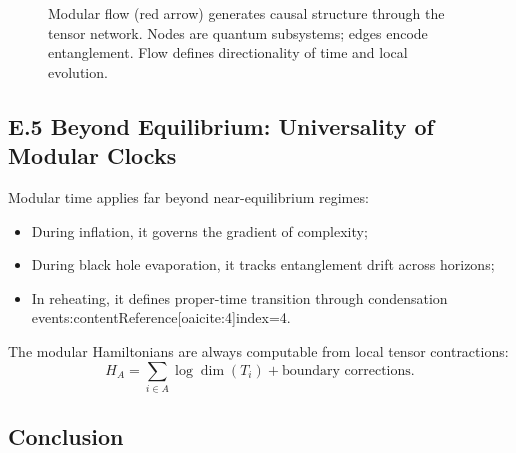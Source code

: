 \documentclass[11pt]{article}
\begin{document}
\begin{figure}[H]
\centering
{}
\caption{Modular flow (red arrow) generates causal structure through the tensor network. Nodes are quantum subsystems; edges encode entanglement. Flow defines directionality of time and local evolution.}
\label{fig:modular-flow-alt}
\end{figure}

\subsection*{E.5 Beyond Equilibrium: Universality of Modular Clocks}

Modular time applies far beyond near-equilibrium regimes:
\begin{itemize}
  \item During inflation, it governs the gradient of complexity;
  \item During black hole evaporation, it tracks entanglement drift across horizons;
  \item In reheating, it defines proper-time transition through condensation events:contentReference[oaicite:4]{index=4}.
\end{itemize}

The modular Hamiltonians are always computable from local tensor contractions:
\[
H_A = \sum_{i \in A} \log \dim(T_i) + \text{boundary corrections}.
\]

\subsection*{Conclusion}
\end{document}
